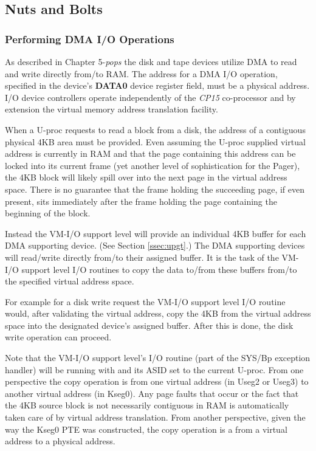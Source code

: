 \subsection{Nuts and Bolts}


\subsubsection{Performing DMA I/O Operations}\label{ssec:dma}
As described in Chapter 5-\emph{pops} the disk and tape devices utilize DMA to read and write directly from/to RAM. 
The address for a DMA I/O operation, specified in the device's \textbf{DATA0} device register field, must be a physical address. 
I/O device controllers operate independently of the \emph{CP15} co-processor and by extension the virtual memory address translation facility.

When a U-proc requests to read a block from a disk, the address of a contiguous physical 4KB area must be provided. 
Even assuming the U-proc supplied virtual address is currently in RAM and that the page containing this address can be locked into its current frame (yet another level of sophistication for the Pager), the 4KB block will likely spill over into the next page in the virtual address space.
There is no guarantee that the frame holding the succeeding page, if even present, sits immediately after the frame holding the page containing the beginning of the block.

Instead the VM-I/O support level will provide an individual 4KB buffer for each DMA supporting device. (See Section \ref{ssec:upgt}.) 
The DMA supporting devices will read/write directly from/to their assigned buffer. 
It is the task of the VM-I/O support level I/O routines to copy the data to/from these buffers from/to the specified virtual address space.

For example for a disk write request the VM-I/O support level I/O routine would, after validating the virtual address, copy the 4KB from the virtual address space into the designated device's assigned buffer. 
After this is done, the disk write operation can proceed.

Note that the VM-I/O support level's I/O routine (part of the SYS/Bp exception handler) will be running with \vmon{} and its ASID set to the current U-proc. 
From one perspective the copy operation is from one virtual address (in Useg2 or Useg3) to another virtual address (in Kseg0). 
Any page faults that occur or the fact that the 4KB source block is not necessarily contiguous in RAM is automatically taken care of by virtual address translation. 
From another perspective, given the way the Kseg0 PTE was constructed, the copy operation is a from a virtual address to a physical address.

